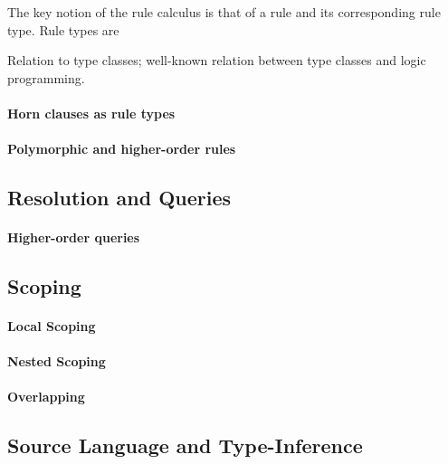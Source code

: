 The key notion of the rule calculus is that of a rule and its
corresponding rule type. Rule types are 

Relation to type classes; well-known relation between 
type classes and logic programming.

\paragraph{Horn clauses as rule types}


\paragraph{Polymorphic and higher-order rules}

\subsection{Resolution and Queries}

\paragraph{Higher-order queries}

\subsection{Scoping}

\paragraph{Local Scoping}

\paragraph{Nested Scoping}

\paragraph{Overlapping}

\subsection{Source Language and Type-Inference}

